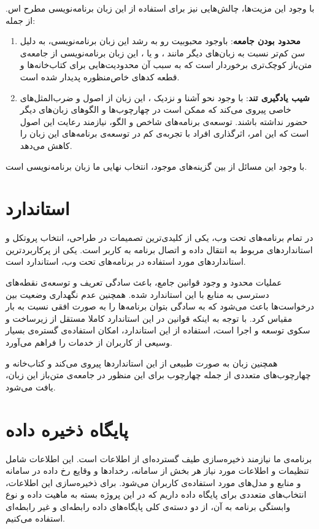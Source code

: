 با وجود این مزیت‌ها، چالش‌هایی نیز برای استفاده از این زبان برنامه‌نویسی مطرح اس\cite{Lockard2019}. از جمله:
\begin{enumerate}
\item \textbf{محدود بودن جامعه}: باوجود محبوبیت رو به رشد این زبان برنامه‌نویسی، به دلیل سن کم‌تر نسبت به زبان‌های دیگر مانند ،  و یا ، این زبان برنامه‌نویسی از جامعه‌ی متن‌باز کوچک‌تری برخوردار است که به سبب آن محدودیت‌هایی برای کتاب‌خانه‌ها و قطعه کد‌های خاص‌منظوره پدیدار شده است.

\item \textbf{شیب یادگیری تند}: با وجود نحو آشنا و نزدیک ، این زبان از اصول و ضرب‌المثل‌های خاصی پیروی می‌کند که ممکن است در چهارچوب‌ها و الگوهای زبان‌های دیگر حضور نداشته باشند. توسعه‌ی برنامه‌های شاخص و الگو، نیازمند رعایت این اصول است که این امر، اثرگذاری افراد با تجربه‌ی کم در توسعه‌ی برنامه‌های این زبان را کاهش می‌دهد.
\end{enumerate}

با وجود این مسائل از بین گزینه‌های موجود، انتخاب نهایی ما زبان برنامه‌نویسی  است.

\section{استاندارد }
در تمام برنامه‌های تحت وب، یکی از کلیدی‌ترین تصمیمات در طراحی، انتخاب پروتکل و استاندارد‌های مربوط به انتقال داده و اتصال برنامه‌ به کاربر است. یکی از پرکاربردترین استانداردهای مورد استفاده در برنامه‌های تحت وب، استاندارد  است.

عملیات محدود و وجود قوانین جامع، باعث سادگی تعریف و توسعه‌ی نقطه‌های دسترسی به منابع با این استاندارد شده. همچنین عدم نگهداری وضعیت بین درخواست‌ها باعث می‌شود که به سادگی بتوان برنامه‌ها را به صورت افقی نسبت به بار مقیاس کرد. با توجه به اینکه قوانین در این استاندارد کاملا مستقل از زیرساخت و سکوی توسعه و اجرا است، استفاده از این استاندارد، امکان استفاده‌ی گستره‌ی بسیار وسیعی از کاربران از خدمات را فراهم می‌آورد.\cite{Fielding:2000}

همچنین زبان  به صورت طبیعی از این استانداردها پیروی می‌کند و کتاب‌خانه و چهارچوب‌های متعددی از جمله چهارچوب  برای این منظور در جامعه‌ی متن‌باز این زبان، یافت می‌شود.

\section{پایگاه ذخیره داده}
برنامه‌ی ما نیازمند ذخیره‌سازی طیف گسترده‌ای از اطلاعات است. این اطلاعات شامل تنظیمات و اطلاعات مورد نیاز هر بخش از سامانه، رخداد‌ها و وقایع رخ داده در سامانه و منابع و مدل‌های مورد استفاده‌ی کاربران می‌شود. برای ذخیره‌سازی این اطلاعات، انتخاب‌های متعددی برای پایگاه داده داریم که در این پروژه بسته به ماهیت داده و نوع وابستگی برنامه به آن، از دو دسته‌ی کلی پایگاه‌های داده رابطه‌ای و غیر رابطه‌ای استفاده می‌کنیم.

